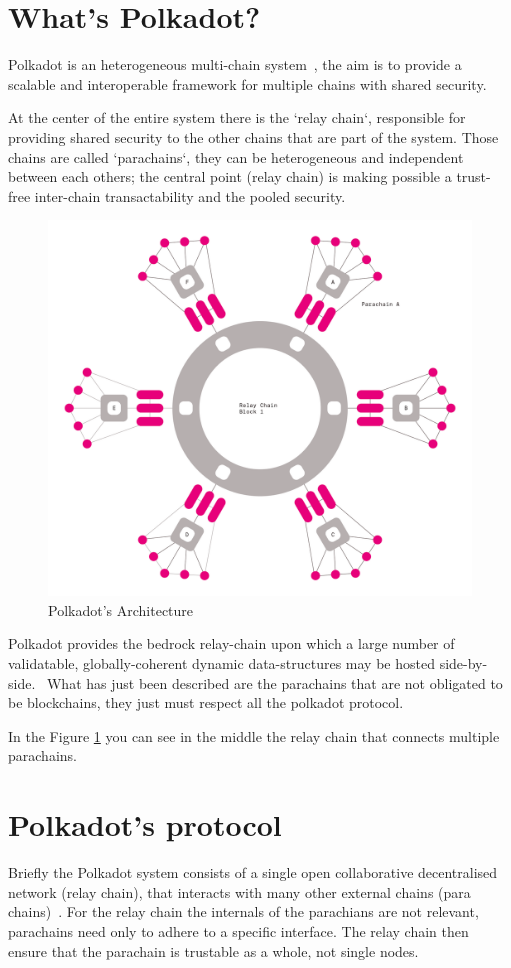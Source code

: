 \section{What's Polkadot?}

Polkadot is an heterogeneous multi-chain system~\cite{wood2016polkadot}, the aim is to provide a scalable and interoperable framework for multiple chains with shared security.~\cite{burdges2020overview}

At the center of the entire system there is the `relay chain`, responsible for providing shared security to the other chains that are part of the system. Those chains are called `parachains`, they can be heterogeneous and independent between each others; the central point (relay chain) is making possible a trust-free inter-chain transactability and the pooled security.~\cite{burdges2020overview}

\begin{figure}[h]
  \centering
  \includegraphics[width=0.5\linewidth]{polkadot_architecture.png}
  \caption{Polkadot's Architecture}
  \label{fig:polkadot_arch}
\end{figure}

Polkadot provides the bedrock relay-chain upon which a large number of validatable, globally-coherent dynamic data-structures may be hosted side-by-side.~\cite{wood2016polkadot} What has just been described are the parachains that are not obligated to be blockchains, they just must respect all the polkadot protocol.

In the Figure \ref{fig:polkadot_arch} you can see in the middle the relay chain that connects multiple parachains.

\section{Polkadot's protocol}

Briefly the Polkadot system consists of a single open collaborative decentralised network (relay chain), that interacts with many other external chains (para chains)~\cite{burdges2020overview}. For the relay chain the internals of the parachians are not relevant, parachains need only to adhere to a specific interface. The relay chain then ensure that the parachain is trustable as a whole, not single nodes.

